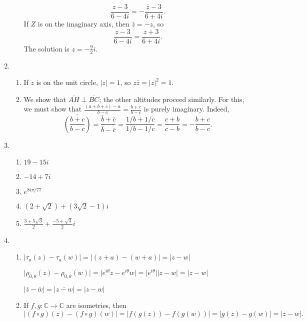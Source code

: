 \begin{enumerate}
\begin{enumerate}
\begin{equation*}
\frac{z - 3}{6 - 4i} = -\frac{\bar{z} - 3}{6 + 4i}.
\end{equation*}
If $Z$ is on the imaginary axis, then $\bar{z} = -z$, so
\begin{equation*}
\frac{z - 3}{6 - 4i} = \frac{z + 3}{6 + 4i}.
\end{equation*}
The solution is $z = -\frac{9}{2}i$.
\end{enumerate}
\item \begin{enumerate}
\item If $z$ is on the unit circle, $\lvert z\rvert = 1$, so $z\bar{z} = \lvert z\rvert^2 = 1$.
\item We show that $\overline{AH}\perp\overline{BC}$; the other altitudes proceed similarly. For this, we must show that $\frac{(a + b + c) - a}{b - c} = \frac{b + c}{b - c}$ is purely imaginary. Indeed,
\begin{equation*}
\bar{\left(\frac{b + c}{b - c}\right)} = \frac{\bar{b} + \bar{c}}{\bar{b} - \bar{c}} = \frac{1/b + 1/c}{1/b - 1/c} = \frac{c + b}{c - b} = -\frac{b + c}{b - c}.
\end{equation*}
\end{enumerate}
\item \begin{enumerate}
\item $19 - 15i$
\item $-14 + 7i$
\item $e^{8i\pi/77}$
\item $(2 + \sqrt{2}) + (3\sqrt{2} - 1)i$
\item $\frac{3 + 5\sqrt{3}}{2} + \frac{-5 + \sqrt{3}}{2}i$
\end{enumerate}
\item \begin{enumerate}
\item $\lvert\tau_a(z) - \tau_a(w)\rvert = \lvert (z + a) - (w + a)\rvert = \lvert z - w\rvert$\par
$\lvert\rho_{0,\theta}(z) - \rho_{0,\theta}(w)\rvert = \lvert e^{i\theta}z - e^{i\theta}w\rvert = \lvert e^{i\theta}\rvert\lvert z - w\rvert = \lvert z - w\rvert$\par
$\lvert\bar{z} - \bar{w}\rvert = \lvert\bar{z - w}\rvert = \lvert z - w\rvert$
\item If $f,g:\mathbb{C}\to\mathbb{C}$ are isometries, then
\begin{equation*}
\lvert (f\circ g)(z) - (f\circ g)(w)\rvert = \lvert f(g(z)) - f(g(w))\rvert = \lvert g(z) - g(w)\rvert = \lvert z - w\rvert.

\end{equation*}
\end{enumerate}
\end{enumerate}
